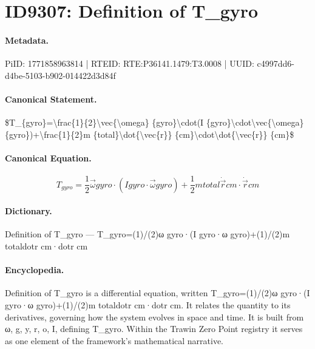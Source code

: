 \section*{ID9307: Definition of T\_gyro}
\paragraph{Metadata.}
PiID: 1771858963814 | RTEID: RTE:P36141.1479:T3.0008 | UUID: c4997dd6-d4be-5103-b902-014422d3d84f

\paragraph{Canonical Statement.}
\$T\_\{gyro\}=\textbackslash{}frac\{1\}\{2\}\textbackslash{}vec\{\textbackslash{}omega\} \{gyro\}\textbackslash{}cdot(I \{gyro\}\textbackslash{}cdot\textbackslash{}vec\{\textbackslash{}omega\} \{gyro\})+\textbackslash{}frac\{1\}\{2\}m \{total\}\textbackslash{}dot\{\textbackslash{}vec\{r\}\} \{cm\}\textbackslash{}cdot\textbackslash{}dot\{\textbackslash{}vec\{r\}\} \{cm\}\$

\paragraph{Canonical Equation.}
\[
T_{gyro}=\frac{1}{2}\vec{\omega} {gyro}\cdot(I {gyro}\cdot\vec{\omega} {gyro})+\frac{1}{2}m {total}\dot{\vec{r}} {cm}\cdot\dot{\vec{r}} {cm}
\]

\paragraph{Dictionary.}
Definition of T\_gyro — T\_gyro=(1)/(2)ω gyro·(I gyro·ω gyro)+(1)/(2)m totaldotr cm·dotr cm

\paragraph{Encyclopedia.}
Definition of T\_gyro is a differential equation, written T\_gyro=(1)/(2)ω gyro·(I gyro·ω gyro)+(1)/(2)m totaldotr cm·dotr cm. It relates the quantity to its derivatives, governing how the system evolves in space and time. It is built from ω, g, y, r, o, I, defining T\_gyro. Within the Trawin Zero Point registry it serves as one element of the framework's mathematical narrative.

